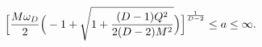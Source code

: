 \begin{equation}
\Big[{M
\omega_D\over 2} \Big(-1 + {\sqrt {1 + {(D-1)Q^2 \over{2 (D-2)
M^2}}}}\Big) \Big]^{1\over{D-2}} \le a \le \infty.
\label{k-rad}
\end{equation}

